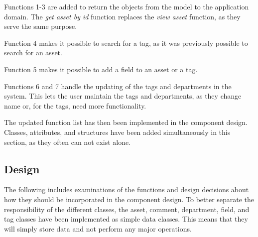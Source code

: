 Functions 1-3 are added to return the objects from the model to the application domain. The \textit{get asset by id} function replaces the \textit{view asset} function, as they serve the same purpose.
\par
Function 4 makes it possible to search for a tag, as it was previously possible to search for an asset.
\par
Function 5 makes it possible to add a field to an asset or a tag.
\par
Functions 6 and 7 handle the updating of the tags and departments in the system. This lets the user maintain the tags and departments, as they change name or, for the tags, need more functionality.
\par
The updated function list has then been implemented in the component design. Classes, attributes, and structures have been added simultaneously in this section, as they often can not exist alone.

\subsection{Design}
The following includes examinations of the functions and design decisions about how they should be incorporated in the component design. To better separate the responsibility of the different classes, the asset, comment, department, field, and tag classes have been implemented as simple data classes. This means that they will simply store data and not perform any major operations.

